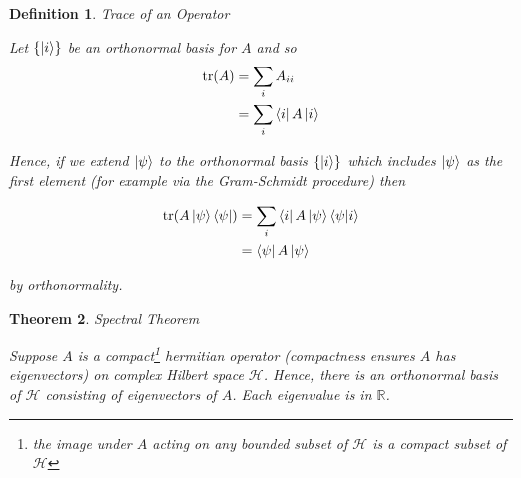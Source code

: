 \documentclass{book}
\newcommand\0{\mathbf{0}}
\newcommand\RR{\mathbb{R}}
\newcommand\<{\langle}
\renewcommand\>{\rangle}
\newtheorem{theorem}{Theorem}[section]
\newtheorem{definition}[theorem]{Definition}
\begin{document}
\begin{definition}
\label{trop}
Trace of an Operator

Let $\{\ket{i}\}$ be an orthonormal basis for $A$ and so
\begin{align*}
\tr(A) &= \sum_i A_{ii} \\
&= \sum_i \bra{i} A \ket{i}	
\end{align*}

Hence, if we extend $\ket{\psi}$ to the orthonormal basis $\{\ket{i}\}$ which includes $\ket{\psi}$ as the first element (for example via the Gram-Schmidt procedure) then

\begin{align*}
	\tr(A\ket{\psi}\bra{\psi}) &= \sum_i \bra{i} A\ket{\psi}\bra{\psi}\ket{i}	 \\
	&= \bra{\psi} A\ket{\psi}
\end{align*}

by orthonormality.
\end{definition}

\begin{theorem}Spectral Theorem
\label{thm:spec}

Suppose $A$ is a compact\footnote{the image under $A$ acting on any bounded subset of $\mathcal{H}$ is a compact subset of $\mathcal{H}$} hermitian operator (compactness ensures $A$ has eigenvectors) on complex Hilbert space $\mathcal{H}$. Hence, there is an orthonormal basis of $\mathcal{H}$ consisting of eigenvectors of $A$. Each eigenvalue is in $\RR$.	
\end{theorem}



\nocite{*}
\printbibliography
\end{document}
